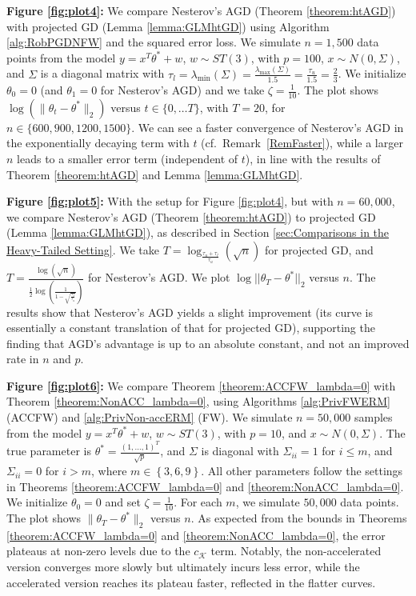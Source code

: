 \documentclass{article}
\begin{document}
\textbf{Figure \ref{fig:plot4}:} We compare Nesterov’s AGD (Theorem \ref{theorem:htAGD}) with projected GD (Lemma \ref{lemma:GLMhtGD}) using Algorithm \ref{alg:RobPGDNFW} and the squared error loss. We simulate $n = 1,500$ data points from the model $y = x^T\theta^* + w$, $w \sim ST(3)$, with $p = 100$, $x \sim N(0, \Sigma)$, and $\Sigma$ is a diagonal matrix with $\tau_l = \lambda_{\min}(\Sigma) = \frac{\lambda_{\max}(\Sigma)}{1.5} = \frac{\tau_u}{1.5} = \frac{2}{3}$. We initialize $\theta_0 = 0$ (and $\theta_1 = 0$ for Nesterov's AGD) and we take $\zeta = \frac{1}{10}$. The plot shows $\log(\|\theta_t-\theta^*\|_2)$ versus $t \in \{0, \dots T\}$, with $T = 20$, for $n \in \{600, 900, 1200, 1500\}$. We can see a faster convergence of Nesterov's AGD in the exponentially decaying term with $t$ (cf.\ Remark~\ref{RemFaster}), while a larger $n$ leads to a smaller error term (independent of $t$), in line with the results of Theorem \ref{theorem:htAGD} and Lemma \ref{lemma:GLMhtGD}.

\textbf{Figure \ref{fig:plot5}:} With the setup for Figure \ref{fig:plot4}, but with $n = 60,000$, we compare Nesterov’s AGD (Theorem \ref{theorem:htAGD}) to projected GD (Lemma \ref{lemma:GLMhtGD}), as described in Section \ref{sec:Comparisons in the Heavy-Tailed Setting}. We take $T = \log_{\frac{\tau_u + \tau_l}{\tau_u}}(\sqrt{n})$ for projected GD, and $T = \frac{\log(\sqrt{n})}{\frac{1}{2}\log\left(\frac{1}{1 - \sqrt{\frac{\tau_l}{\tau_u}}}\right)}$ for Nesterov's AGD. We plot $\log||\theta_T-\theta^*||_2$ versus $n$. The results show that Nesterov’s AGD yields a slight improvement (its curve is essentially a constant translation of that for projected GD), supporting the finding that AGD’s advantage is up to an absolute constant, and not an improved rate in $n$ and $p$.

\textbf{Figure \ref{fig:plot6}:} We compare Theorem \ref{theorem:ACCFW_lambda=0} with Theorem \ref{theorem:NonACC_lambda=0}, using Algorithms \ref{alg:PrivFWERM} (ACCFW) and \ref{alg:PrivNon-accERM} (FW). We simulate $n = 50,000$ samples from the model $y = x^T\theta^* + w$, $w \sim ST(3)$, with $p = 10$, and $x \sim N(0, \Sigma)$. The true parameter is $\theta^* = \frac{(1, \dots, 1)^T}{\sqrt{p}}$, and $\Sigma$ is diagonal with $\Sigma_{ii} = 1$ for $i \leq m$, and $\Sigma_{ii} = 0$ for $i > m$, where $m \in \left\{3, 6, 9\right\}$. All other parameters follow the settings in Theorems \ref{theorem:ACCFW_lambda=0} and \ref{theorem:NonACC_lambda=0}. We initialize $\theta_0 = 0$ and set $\zeta = \frac{1}{10}$. For each $m$, we simulate $50,000$ data points. The plot shows $\|\theta_T-\theta^*\|_2$ versus $n$. As expected from the bounds in Theorems \ref{theorem:ACCFW_lambda=0} and \ref{theorem:NonACC_lambda=0}, the error plateaus at non-zero levels due to the $c_{\mathcal{K}}$ term. Notably, the non-accelerated version converges more slowly but ultimately incurs less error, while the accelerated version reaches its plateau faster, reflected in the flatter curves.
\end{document}
